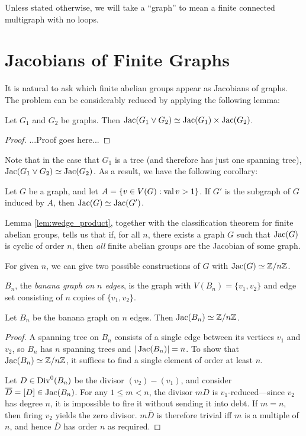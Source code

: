 \documentclass{amsart}
\begin{document}
Unless stated otherwise, we will take a ``graph'' to mean a finite
connected multigraph with no loops.


\section{Jacobians of Finite Graphs}
It is natural to ask which finite abelian groups appear as Jacobians
of graphs. The problem can be considerably reduced by applying the
following lemma:

\begin{lem}
\label{lem:wedge_product}
Let $G_1$ and $G_2$ be graphs. Then $\operatorname{Jac}(G_1 \vee G_2) \simeq
\operatorname{Jac}(G_1) \times \operatorname{Jac}(G_2)$.
\end{lem}
\begin{proof}
  ...Proof goes here...
\end{proof}

Note that in the case that $G_1$ is a tree (and therefore has just one
spanning tree), $\operatorname{Jac}(G_1 \vee G_2) \simeq \operatorname{Jac}(G_2)$. As a result, we
have the following corollary:
\begin{cor}
  \label{cor:1_valent}
  Let $G$ be a graph, and let $A = \{v \in V(G) : \operatorname{val}{v} > 1\}$. If
  $G'$ is the subgraph of $G$ induced by $A$, then $\operatorname{Jac}(G) \simeq
  \operatorname{Jac}(G')$.
\end{cor}

Lemma \ref{lem:wedge_product}, together with the classification
theorem for finite abelian groups, tells us that if, for all $n$,
there exists a graph $G$ such that $\operatorname{Jac}(G)$ is cyclic of order $n$,
then \emph{all} finite abelian groups are the Jacobian of some graph.

For given $n$, we can give two possible constructions of $G$ with
$\operatorname{Jac}(G) \simeq \mathbb{Z}/n\mathbb{Z}$.

\begin{defn}
  $B_n$, the \emph{banana graph on $n$ edges}, is the graph with
  $V(B_n) = \{v_1, v_2\}$ and edge set consisting of $n$ copies of
  $\{v_1, v_2\}$.
\end{defn}

\begin{prop}
  \label{prop:banana_cyclic}
  Let $B_n$ be the banana graph on $n$ edges. Then $\operatorname{Jac}(B_n) \simeq \mathbb{Z}/n\mathbb{Z}$.
\end{prop}

\begin{proof}
  A spanning tree on $B_n$ consists of a single edge between its
  vertices $v_1$ and $v_2$, so $B_n$ has $n$ spanning trees and
  $|\operatorname{Jac}(B_n)| = n$. To show that $\operatorname{Jac}(B_n) \simeq \mathbb{Z}/n\mathbb{Z}$, it
  suffices to find a single element of order at least $n$.

  Let $D \in \operatorname{Div}^0(B_n)$ be the divisor $(v_2) - (v_1)$, and consider
  $\overline{D} = [D] \in \operatorname{Jac}(B_n)$. For any $1 \le m < n$, the
  divisor $mD$ is $v_1$-reduced---since $v_2$ has degree $n$, it is
  impossible to fire it without sending it into debt. If $m=n$, then
  firing $v_2$ yields the zero divisor. $m\overline{D}$ is therefore
  trivial iff $m$ is a multiple of $n$, and hence $\overline{D}$ has
  order $n$ as required.
\end{proof}
\end{document}
